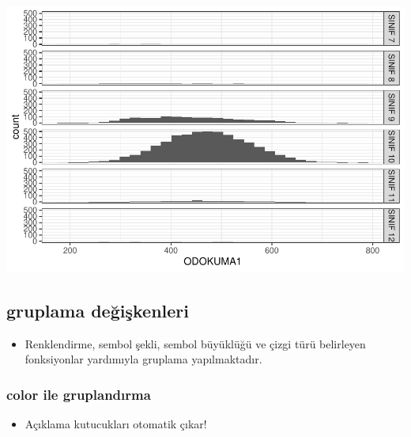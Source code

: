 \documentclass[
  oneside]{book}
\providecommand{\tightlist}{%
  \setlength{\itemsep}{0pt}\setlength{\parskip}{0pt}}
\begin{document}
\begin{center}\includegraphics[width=1\linewidth]{15-betimleyici-istatistik_files/figure-latex/unnamed-chunk-35-1} \end{center}

\hypertarget{gruplama-deux11fiux15fkenleri}{%
\subsection{gruplama değişkenleri}\label{gruplama-deux11fiux15fkenleri}}

\begin{itemize}
\tightlist
\item
  Renklendirme, sembol şekli, sembol büyüklüğü ve çizgi türü belirleyen fonksiyonlar yardımıyla gruplama yapılmaktadır.
\end{itemize}

\hypertarget{color-ile-gruplandux131rma}{%
\subsubsection{color ile gruplandırma}\label{color-ile-gruplandux131rma}}

\begin{itemize}
\tightlist
\item
  Açıklama kutucukları otomatik çıkar!
\end{itemize}
\end{document}
